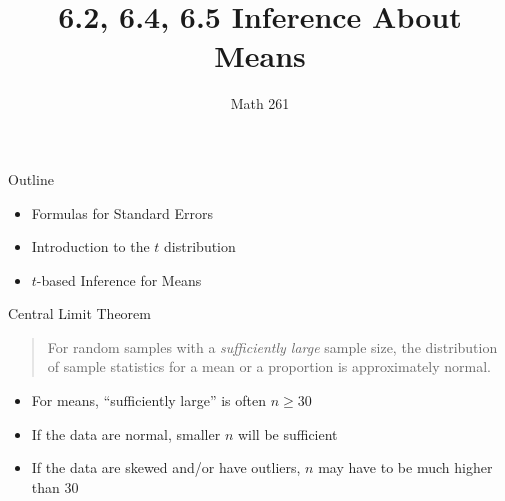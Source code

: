 \documentclass[
  ignorenonframetext,
  aspectratio=32,
]{beamer}
\title{6.2, 6.4, 6.5 Inference About Means}
\subtitle{Math 261}
\author{}
\date{}
\providecommand{\tightlist}{%
  \setlength{\itemsep}{0pt}\setlength{\parskip}{0pt}}\usepackage{longtable,booktabs,array}
\begin{document}
\frame{\titlepage}
\ifdefined\Shaded\renewenvironment{Shaded}{\begin{tcolorbox}[borderline west={3pt}{0pt}{shadecolor}, breakable, boxrule=0pt, frame hidden, sharp corners, interior hidden, enhanced]}{\end{tcolorbox}}\fi

\begin{frame}{Outline}
\protect\hypertarget{outline}{}
\begin{itemize}
\tightlist
\item
  Formulas for Standard Errors\\
\item
  Introduction to the \(t\) distribution
\item
  \(t\)-based Inference for Means
\end{itemize}
\end{frame}

\begin{frame}{Central Limit Theorem}
\protect\hypertarget{central-limit-theorem}{}
\begin{quote}
For random samples with a \emph{sufficiently large} sample size, the
distribution of sample statistics for a mean or a proportion is
approximately normal.
\end{quote}

\begin{itemize}
\tightlist
\item
  For means, ``sufficiently large'' is often \(n \ge 30\)\\
\item
  If the data are normal, smaller \(n\) will be sufficient\\
\item
  If the data are skewed and/or have outliers, \(n\) may have to be much
  higher than 30
\end{itemize}
\end{frame}
\end{document}
